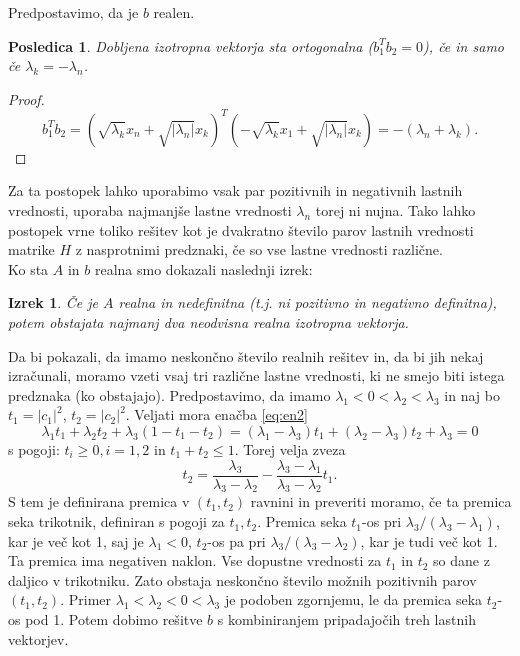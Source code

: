 \documentclass[12pt,a4paper]{amsart}
\theoremstyle{definition}
\theoremstyle{plain}
\newtheorem{izrek}[definicija]{Izrek}
\newtheorem{posledica}[definicija]{Posledica}
\newcommand{\abs}[1]{ \left\lvert#1\right\rvert}
\begin{document}
Predpostavimo, da je $b$ realen.
\begin{posledica}\cite{lipkin}
Dobljena izotropna vektorja sta ortogonalna ($b_1 ^T b_2=0$), če in samo če $\lambda_k=-\lambda_n$.
\end{posledica}
\begin{proof}%
$$b_1 ^T b_2=(\sqrt{\lambda_k}x_n+\sqrt{\abs{\lambda_n}}x_k)^T (-\sqrt{\lambda_k}x_1+\sqrt{\abs{\lambda_n}}x_k )= -(\lambda_n +\lambda_k).$$
\end{proof}
Za ta postopek lahko uporabimo vsak par pozitivnih in negativnih lastnih vrednosti, uporaba najmanjše lastne vrednosti $\lambda_n$ torej ni nujna. Tako lahko postopek vrne toliko rešitev kot je dvakratno število parov lastnih vrednosti matrike $H$ z nasprotnimi predznaki, če so vse lastne vrednosti različne.\\
Ko sta $A$ in $b$ realna smo dokazali naslednji izrek:
\begin{izrek}
Če je $A$ realna in nedefinitna (t.j. ni pozitivno in negativno definitna), potem obstajata najmanj dva neodvisna realna izotropna vektorja.
\end{izrek}
Da bi pokazali, da imamo neskončno število realnih rešitev in, da bi jih nekaj izračunali, moramo vzeti vsaj tri različne lastne vrednosti, ki ne smejo biti istega predznaka (ko obstajajo). Predpostavimo, da imamo $\lambda_1 <0<\lambda_2<\lambda_3$ in naj bo $t_1=\abs{c_1}^2$, $t_2=\abs{c_2}^2$. Veljati mora enačba \eqref{eq:en2}
\begin{equation}\label{trije}
\lambda_1 t_1 +\lambda_2 t_2 +\lambda_3 (1- t_1 -t_2)=(\lambda_1 -\lambda_3)t_1 +(\lambda_2 -\lambda_3)t_2 +\lambda_3=0
\end{equation}
s pogoji: $t_i \ge 0, i=1,2$ in $t_1 +t_2\le1$. Torej velja zveza $$t_2=\frac{\lambda_3}{\lambda_3 - \lambda_2} -\frac{\lambda_3 -\lambda_1}{\lambda_3 -\lambda_2}t_1.$$
S tem je definirana premica v $(t_1,t_2)$ ravnini in preveriti moramo, če ta premica seka trikotnik, definiran s pogoji za $t_1,t_2$. Premica seka $t_1$-os pri $\lambda_3 /(\lambda_3 -\lambda_1)$, kar je več kot 1, saj je $\lambda_1 <0$, $t_2$-os pa pri $\lambda_3 /(\lambda_3 - \lambda_2)$, kar je tudi več kot 1. Ta premica ima negativen naklon. Vse dopustne vrednosti za $t_1$ in $t_2$ so dane z daljico v trikotniku. Zato obstaja neskončno število možnih pozitivnih parov $(t_1,t_2)$.
Primer $\lambda_1 <\lambda_2<0<\lambda_3$ je podoben zgornjemu, le da premica seka $t_2$-os pod 1. Potem dobimo rešitve $b$ s kombiniranjem pripadajočih treh lastnih vektorjev. %
\end{document}

